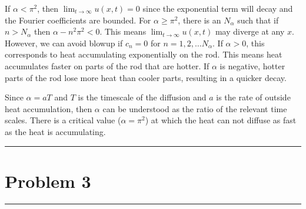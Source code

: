 \documentclass[fontsize=11pt]{article} %
\theoremstyle{plain}
\numberwithin{equation}{section} %
\numberwithin{figure}{section} %
\numberwithin{table}{section} %
\begin{document}
\begin{enumerate}[\bf (a)]
        If $\alpha < \pi^2$, then $\lim_{t\rightarrow\infty}u(x,t) = 0$ since the exponential term will decay and the Fourier coefficients are bounded.  For $\alpha \geq \pi^2$, there is an $N_\alpha$ such that if $n > N_\alpha$ then $\alpha - n^2 \pi^2 < 0$.  This means $\lim_{t\rightarrow\infty}u(x,t)$ may diverge at any $x$.  However, we can avoid blowup if $c_n = 0$ for $n = 1, 2, \dots N_\alpha$.  If $\alpha > 0$, this corresponds to heat accumulating exponentially on the rod.  This means heat accumulates faster on parts of the rod that are hotter.  If $\alpha$ is negative, hotter parts of the rod lose more heat than cooler parts, resulting in a quicker decay.

        Since $\alpha = aT$ and $T$ is the timescale of the diffusion and $a$ is the rate of outside heat accumulation, then $\alpha$ can be understood as the ratio of the relevant time scales.  There is a critical value ($\alpha = \pi^2$) at which the heat can not diffuse as fast as the heat is accumulating.
\end{enumerate}

\begin{center}
    \noindent\rule{5cm}{1pt}
\end{center}
\section{\bf Problem 3}
\begin{center}
    \noindent\rule{5cm}{1pt}
\end{center}
\end{document}
